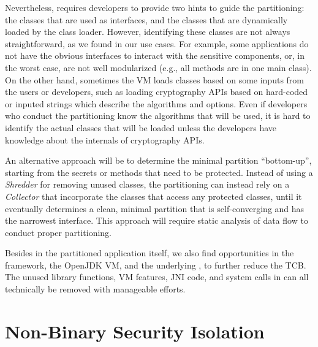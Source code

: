 Nevertheless, \civet{} requires developers to provide two hints to guide the partitioning:
the classes that are used as interfaces,
and the classes that are dynamically loaded by the class loader.
However, identifying these classes are not always straightforward,
as we found in our use cases.
For example, some applications do not have the obvious interfaces
to interact with the sensitive components,
or, in the worst case, are not well modularized (e.g., all methods are in one main class).
On the other hand,
sometimes the \java{} VM loads classes based on some inputs from the users or developers,
such as loading cryptography APIs based on hard-coded or inputed strings
which describe the algorithms and options.
Even if developers who conduct the partitioning know the algorithms that will be used,
it is hard to identify the actual classes that will be loaded
unless the developers have knowledge about the internals of cryptography APIs.


An alternative approach will be to determine the minimal partition ``bottom-up'',
starting from the secrets or methods that need to be protected.
Instead of using a \emph{Shredder} for removing unused classes,
the partitioning can instead rely on a \emph{Collector} that incorporate the classes
that access any protected classes,
until it eventually determines a clean,
minimal partition
that is self-converging and has the narrowest interface.
This approach will require static analysis of data flow to conduct proper partitioning.

Besides in the partitioned application itself,
we also find opportunities in the \civet{} framework, the OpenJDK \java{} VM,
and the underlying \graphene{} \libos{},
to further reduce the TCB.
The unused library functions, \java{} VM features, JNI code, and system calls in \graphene{}
can all technically be removed with manageable efforts.


\section{Non-Binary Security Isolation}


